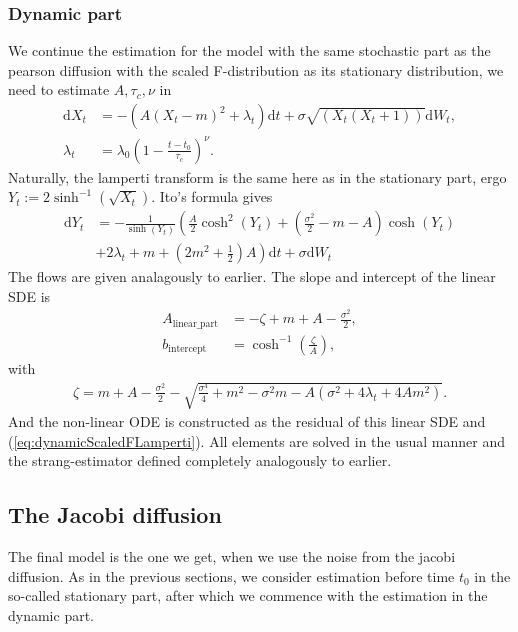 \subsubsection{Dynamic part}
We continue the estimation for the model with the same stochastic part as the pearson diffusion with the scaled F-distribution as its stationary distribution, we need to estimate $A, \tau_c, \nu$ in
\begin{align}
    \mathrm{d}X_t &= -\left(A(X_t - m)^2 + \lambda_t\right)\mathrm{d}t + \sigma \sqrt{\left(X_t\left(X_t + 1\right)\right)}\mathrm{d}W_t,\\
    \lambda_t &= \lambda_0 \left(1 - \frac{t - t_0}{\tau_c}\right)^\nu.
\end{align}
Naturally, the lamperti transform is the same here as in the stationary part, ergo $Y_t := 2\sinh^{-1}\left(\sqrt{X_t}\right)$. Ito's formula gives 
\begin{align}
    \mathrm{d}Y_t &= - \frac{1}{\sinh\left(Y_t\right)}\left(\frac{A}{2}\cosh^2(Y_t) + \left(\frac{\sigma^2}{2} - m - A\right)\cosh(Y_t) \right. \nonumber \\ 
    &+\left. 2\lambda_t + m + \left(2m^2 + \frac{1}{2}\right)A\right)\mathrm{d}t + \sigma \mathrm{d}W_t \label{eq:dynamicScaledFLamperti}
\end{align}
The flows are given analagously to earlier. The slope and intercept of the linear SDE is
\begin{align}
    A_{\mathrm{linear\_part}} &= -\zeta + m + A - \frac{\sigma^2}{2},\\
    b_{\mathrm{intercept}} &= \cosh^{-1}\left(\frac{\zeta}{A}\right),
\end{align}
with
\begin{align}
    \zeta = m + A - \frac{\sigma^2}{2} - \sqrt{\frac{\sigma^4}{4} + m^2 - \sigma^2m - A\left(\sigma^2 + 4 \lambda_t + 4 A m^2\right)}.
\end{align}
And the non-linear ODE is constructed as the residual of this linear SDE and (\ref{eq:dynamicScaledFLamperti}). All elements are solved in the usual manner and the strang-estimator defined completely analogously to earlier.
\subsection{The Jacobi diffusion}
The final model is the one we get, when we use the noise from the jacobi diffusion. As in the previous sections, we consider estimation before time $t_0$ in the so-called stationary part, after which we commence with the estimation in the dynamic part.
